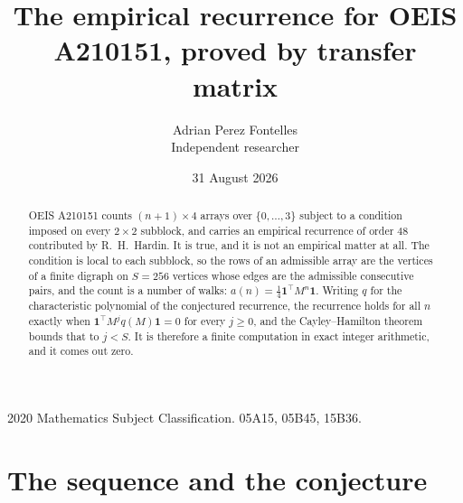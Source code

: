 \documentclass[11pt,a4paper]{article}
\title{The empirical recurrence for OEIS A210151, proved by transfer matrix}
\author{Adrian Perez Fontelles\\ \small Independent researcher}
\date{31 August 2026}
\theoremstyle{plain}
\theoremstyle{definition}
\begin{document}
\maketitle

\begin{abstract}
OEIS A210151 counts $(n+1)\times4$ arrays over $\{0,\dots,3\}$ subject to a condition imposed on
every $2\times2$ subblock, and carries an empirical recurrence of order $48$ contributed
by R.~H.~Hardin. It is true, and it is not an empirical matter at all. The condition is local
to each subblock, so the rows of an admissible array are the vertices of a finite digraph
on $S=256$ vertices whose edges are the admissible consecutive pairs, and the count is a
number of walks: $a(n)=\tfrac1{4}\mathbf{1}^{\!\top}M^{n}\mathbf{1}$. Writing $q$
for the characteristic polynomial of the conjectured recurrence, the recurrence holds for all
$n$ exactly when $\mathbf{1}^{\!\top}M^{j}q(M)\mathbf{1}=0$ for every $j\ge0$, and the
Cayley--Hamilton theorem bounds that to $j<S$. It is therefore a finite computation in exact
integer arithmetic, and it comes out zero.
\end{abstract}

\noindent\small 2020 Mathematics Subject Classification. 05A15, 05B45, 15B36.\normalsize

\section{The sequence and the conjecture}
\end{document}
